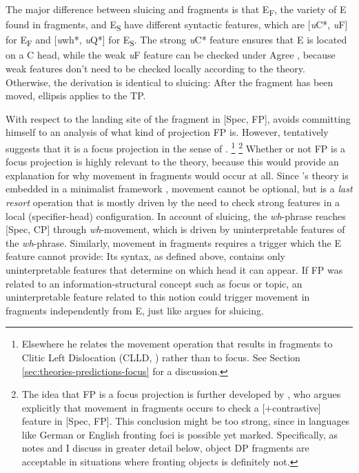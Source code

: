 The major difference between sluicing and fragments is that E\textsubscript{F}, the variety of E found in fragments, and E\textsubscript{S} have different syntactic features, which are [\textit{u}C*, \textit{u}F] for E\textsubscript{F} and [\textit{u}wh*, \textit{u}Q*] for E\textsubscript{S}. The strong \textit{u}C* feature ensures that E is located on a C head, while the weak \textit{u}F feature can be checked under Agree \citep[707]{merchant2004}, because weak features don't need to be checked locally according to the theory. Otherwise, the derivation is identical to sluicing: After the fragment has been moved, ellipsis applies to the TP.

With respect to the landing site of the fragment in [Spec, FP], \citeauthor{merchant2004} avoids committing himself to an analysis of what kind of projection FP is. However, \citet[675]{merchant2004} tentatively suggests that it is a focus projection in the sense of \citet{rizzi1997}.%
%
\footnote{Elsewhere \citep[703]{merchant2004} he relates the movement operation that results in fragments to Clitic Left Dislocation (CLLD, ) rather than to focus. See Section \ref{sec:theories-predictions-focus} for a discussion.}\afterfn%
%
%
\footnote{The idea that FP is a focus projection is further developed by \citet{gengel2007}, who argues explicitly that movement in fragments occurs to check a [$+$contrastive] feature in [Spec, FP]. This conclusion might be too strong, since in languages like German or English fronting foci is possible yet marked. Specifically, as \citet{weir2014} notes and I discuss in greater detail below, object DP fragments are acceptable in situations where fronting objects is definitely not.}\afterfn
%
Whether or not FP is a focus projection is highly relevant to the theory, because this would provide an explanation for why movement in fragments would occur at all. Since \citeauthor{merchant2004}'s theory is embedded in a minimalist framework \citep{chomsky1995}, movement cannot be optional, but is a \textit{last resort} operation that is mostly driven by the need to check strong features in a local (specifier-head) configuration. In  account of sluicing, the \textit{wh}-phrase reaches [Spec, CP] through \textit{wh}-movement, which is driven by uninterpretable features of the \textit{wh}-phrase. Similarly, movement in fragments requires a trigger which the E feature cannot provide: Its syntax, as defined above, contains only uninterpretable features that determine on which head it can appear. If FP was related to an information-structural concept such as focus or topic, an uninterpretable feature related to this notion could trigger movement in fragments independently from E, just like \citet{merchant2001} argues for sluicing.

